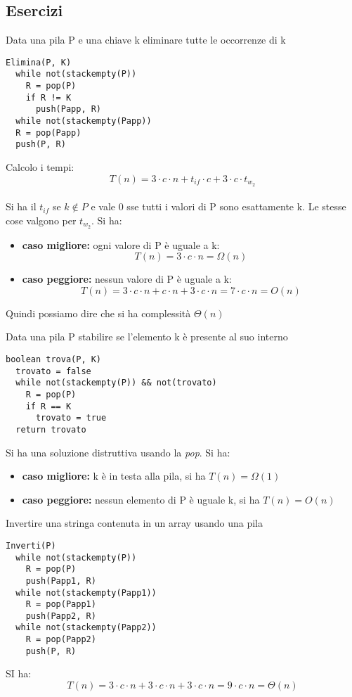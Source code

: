 \documentclass[a4paper,12pt,oneside,tikz]{book}
\begin{document}
\subsection{Esercizi}
\begin{esercizio}
	Data una pila P e una chiave k eliminare tutte le occorrenze di k
	\begin{verbatim}
Elimina(P, K)
  while not(stackempty(P))
    R = pop(P)
    if R != K
      push(Papp, R)
  while not(stackempty(Papp))
  R = pop(Papp)
  push(P, R)
\end{verbatim}
	Calcolo i tempi:
	$$T(n)=3\cdot c\cdot n+t_{if}\cdot c+3\cdot c\cdot t_{w_2}$$\\
	\newpage
	Si ha il $t_{if}$ se $k\not\in P$ e vale 0 sse tutti i valori di P sono esattamente k. Le stesse cose valgono per $t_{w_2}$. Si ha:
	\begin{itemize}
		\item \textbf{caso migliore:} ogni valore di P è uguale a k:
		      $$T(n)=3\cdot c\cdot n=\Omega(n)$$
		\item \textbf{caso peggiore:} nessun valore di P è uguale  a k:
		      $$T(n)=3\cdot c\cdot n+c\cdot n+3\cdot c\cdot n= 7\cdot c\cdot n=O(n)$$
	\end{itemize}
	Quindi possiamo dire che si ha complessità $\Theta(n)$
\end{esercizio}
\begin{esercizio}
	Data una pila P stabilire se l'elemento k è presente al suo interno
	\begin{verbatim}
boolean trova(P, K)
  trovato = false
  while not(stackempty(P)) && not(trovato)
    R = pop(P)
    if R == K
      trovato = true
  return trovato
\end{verbatim}
	Si ha una soluzione distruttiva usando la \textit{pop}. Si ha:
	\begin{itemize}
		\item \textbf{caso migliore:} k è in testa alla pila, si ha $T(n)=\Omega(1)$
		\item \textbf{caso peggiore:} nessun elemento di P è uguale k, si ha $T(n)=O(n)$
	\end{itemize}
\end{esercizio}
\begin{esercizio}
	Invertire una stringa contenuta in un array usando una pila
	\begin{verbatim}
Inverti(P)
  while not(stackempty(P))
    R = pop(P)
    push(Papp1, R)
  while not(stackempty(Papp1))
    R = pop(Papp1)
    push(Papp2, R)
  while not(stackempty(Papp2))
    R = pop(Papp2)
    push(P, R)
\end{verbatim}
	SI ha:
	$$T(n)=3\cdot c\cdot n+3\cdot c\cdot n+3\cdot c\cdot n=9\cdot c \cdot n=\Theta(n)$$
\end{esercizio}
\end{document}

